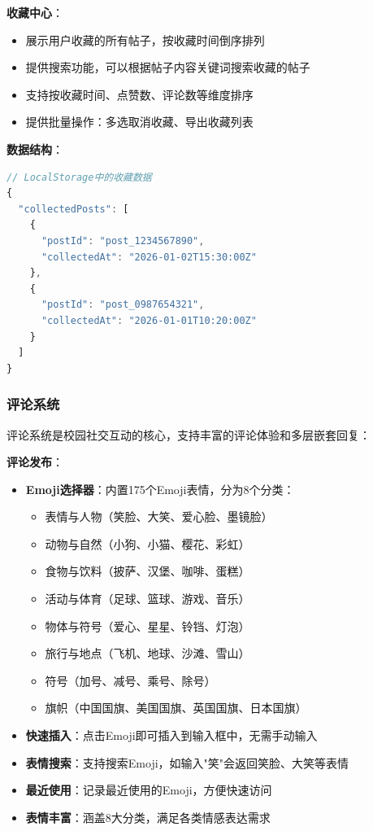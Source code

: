 \documentclass[12pt,a4paper]{article}
\begin{document}
\textbf{收藏中心}：
\begin{itemize}
    \item 展示用户收藏的所有帖子，按收藏时间倒序排列
    \item 提供搜索功能，可以根据帖子内容关键词搜索收藏的帖子
    \item 支持按收藏时间、点赞数、评论数等维度排序
    \item 提供批量操作：多选取消收藏、导出收藏列表
\end{itemize}

\textbf{数据结构}：
\begin{lstlisting}[language=JavaScript]
// LocalStorage中的收藏数据
{
  "collectedPosts": [
    {
      "postId": "post_1234567890",
      "collectedAt": "2026-01-02T15:30:00Z"
    },
    {
      "postId": "post_0987654321",
      "collectedAt": "2026-01-01T10:20:00Z"
    }
  ]
}
\end{lstlisting}

\subsubsection{评论系统}

评论系统是校园社交互动的核心，支持丰富的评论体验和多层嵌套回复：

\textbf{评论发布}：
\begin{itemize}
    \item \textbf{Emoji选择器}：内置175个Emoji表情，分为8个分类：
        \begin{itemize}
            \item 表情与人物（笑脸、大笑、爱心脸、墨镜脸）
            \item 动物与自然（小狗、小猫、樱花、彩虹）
            \item 食物与饮料（披萨、汉堡、咖啡、蛋糕）
            \item 活动与体育（足球、篮球、游戏、音乐）
            \item 物体与符号（爱心、星星、铃铛、灯泡）
            \item 旅行与地点（飞机、地球、沙滩、雪山）
            \item 符号（加号、减号、乘号、除号）
            \item 旗帜（中国国旗、美国国旗、英国国旗、日本国旗）
        \end{itemize}
    \item \textbf{快速插入}：点击Emoji即可插入到输入框中，无需手动输入
    \item \textbf{表情搜索}：支持搜索Emoji，如输入"笑"会返回笑脸、大笑等表情
    \item \textbf{最近使用}：记录最近使用的Emoji，方便快速访问
    \item \textbf{表情丰富}：涵盖8大分类，满足各类情感表达需求
\end{itemize}
\end{document}
